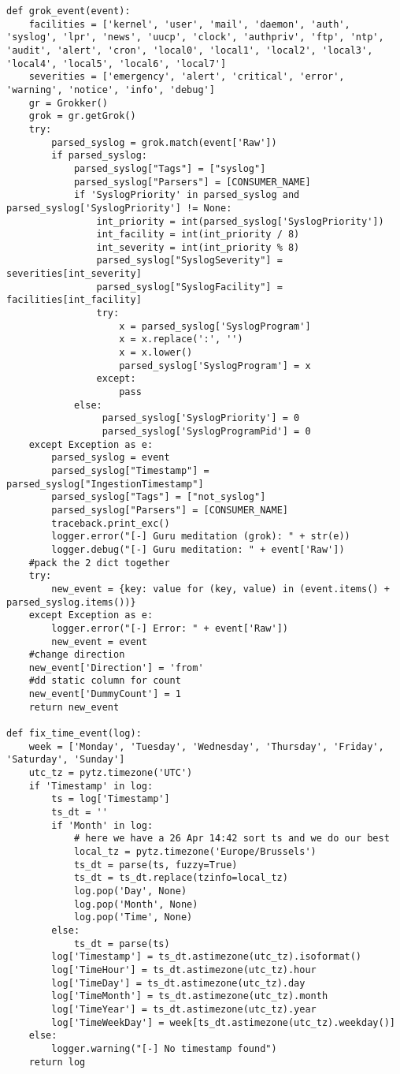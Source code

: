 \documentclass[a4paper,12pt]{article}
\begin{document}
{\begin{lstlisting}
def grok_event(event):
    facilities = ['kernel', 'user', 'mail', 'daemon', 'auth', 'syslog', 'lpr', 'news', 'uucp', 'clock', 'authpriv', 'ftp', 'ntp', 'audit', 'alert', 'cron', 'local0', 'local1', 'local2', 'local3', 'local4', 'local5', 'local6', 'local7']
    severities = ['emergency', 'alert', 'critical', 'error', 'warning', 'notice', 'info', 'debug']
    gr = Grokker()
    grok = gr.getGrok()
    try:
        parsed_syslog = grok.match(event['Raw'])
        if parsed_syslog:
            parsed_syslog["Tags"] = ["syslog"]
            parsed_syslog["Parsers"] = [CONSUMER_NAME]
            if 'SyslogPriority' in parsed_syslog and parsed_syslog['SyslogPriority'] != None:
                int_priority = int(parsed_syslog['SyslogPriority'])
                int_facility = int(int_priority / 8)
                int_severity = int(int_priority % 8)
                parsed_syslog["SyslogSeverity"] = severities[int_severity]
                parsed_syslog["SyslogFacility"] = facilities[int_facility]
                try:
                    x = parsed_syslog['SyslogProgram']
                    x = x.replace(':', '')
                    x = x.lower()
                    parsed_syslog['SyslogProgram'] = x
                except:
                    pass
            else:
                 parsed_syslog['SyslogPriority'] = 0
                 parsed_syslog['SyslogProgramPid'] = 0
    except Exception as e:
        parsed_syslog = event
        parsed_syslog["Timestamp"] = parsed_syslog["IngestionTimestamp"]
        parsed_syslog["Tags"] = ["not_syslog"]
        parsed_syslog["Parsers"] = [CONSUMER_NAME]
        traceback.print_exc()
        logger.error("[-] Guru meditation (grok): " + str(e))
        logger.debug("[-] Guru meditation: " + event['Raw'])
    #pack the 2 dict together
    try:
        new_event = {key: value for (key, value) in (event.items() + parsed_syslog.items())}
    except Exception as e:
        logger.error("[-] Error: " + event['Raw'])
        new_event = event
    #change direction 
    new_event['Direction'] = 'from'
    #dd static column for count
    new_event['DummyCount'] = 1
    return new_event

def fix_time_event(log):
    week = ['Monday', 'Tuesday', 'Wednesday', 'Thursday', 'Friday', 'Saturday', 'Sunday']
    utc_tz = pytz.timezone('UTC')
    if 'Timestamp' in log:
        ts = log['Timestamp']
        ts_dt = ''
        if 'Month' in log:
            # here we have a 26 Apr 14:42 sort ts and we do our best
            local_tz = pytz.timezone('Europe/Brussels')
            ts_dt = parse(ts, fuzzy=True)
            ts_dt = ts_dt.replace(tzinfo=local_tz)
            log.pop('Day', None)
            log.pop('Month', None)
            log.pop('Time', None)
        else:
            ts_dt = parse(ts)
        log['Timestamp'] = ts_dt.astimezone(utc_tz).isoformat()
        log['TimeHour'] = ts_dt.astimezone(utc_tz).hour
        log['TimeDay'] = ts_dt.astimezone(utc_tz).day
        log['TimeMonth'] = ts_dt.astimezone(utc_tz).month
        log['TimeYear'] = ts_dt.astimezone(utc_tz).year
        log['TimeWeekDay'] = week[ts_dt.astimezone(utc_tz).weekday()]
    else:
        logger.warning("[-] No timestamp found")
    return log


\end{lstlisting}}
\end{document}
